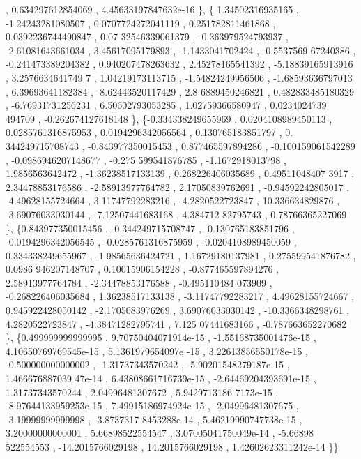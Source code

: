 \begin{DoxyCode}
      , 0.634297612854069 , 4.45633197847632e-16 \},
\{ 1.34502316935165 , -1.24243281080507 , 0.0707724272041119 , 0.251782811461868 , 0.0392236744490847 , 0.07
      32546339061379 , -0.363979524793937 , -2.61081643661034 ,  3.45617095179893 ,  -1.1433041702424 , -0.5537569
      67240386 , -0.241473389204382 , 0.940207478263632 ,  2.45278165541392 , -5.18839165913916 ,  3.2576634641749
      7 ,  1.04219173113715 , -1.54824249956506 , -1.68593636797013 ,  6.39693641182384 , -8.62443520117429 ,  2.8
      6889450246821 , 0.482833485180329 , -6.76931731256231 ,  6.50602793053285 ,  1.02759366580947 , 0.0234024739
      494709 , -0.262674127618148 \},
\{-0.334338249655969 , 0.0204108989450113 , 0.0285761316875953 , 0.0194296342056564 , 0.130765183851797 , 0.
      344249715708743 , -0.843977350015453 , 0.877465597894286 , -0.100159061542289 , -0.0986946207148677 , -0.275
      599541876785 ,  -1.1672918013798 ,   1.9856563642472 , -1.36238517133139 , 0.268226406035689 , 0.49511048407
      3917 ,  2.34478853176586 , -2.58913977764782 ,  2.17050839762691 , -0.94592242805017 , -4.49628155724664 ,  
      3.11747792283216 ,  -4.2820522723847 ,   10.336634829876 , -3.69076033030144 , -7.12507441683168 ,  4.384712
      82795743 ,  0.78766365227069 \},
\{0.843977350015456 , -0.344249715708747 , -0.130765183851796 , -0.0194296342056545 , -0.0285761316875959 , 
      -0.0204108989450059 , 0.334338249655967 , -1.98565636424721 ,  1.16729180137981 , 0.275599541876782 , 0.0986
      946207148707 ,  0.10015906154228 , -0.877465597894276 ,  2.58913977764784 , -2.34478853176588 , -0.495110484
      073909 , -0.268226406035684 ,  1.36238517133138 , -3.11747792283217 ,  4.49628155724667 , 0.945922428050142 
      ,  -2.1705083976269 ,  3.69076033030142 , -10.3366348298761 ,   4.2820522723847 , -4.38471282795741 ,  7.125
      07441683166 , -0.787663652270682 \},
\{0.499999999999995 , 9.70750404071914e-15 , -1.55168735001476e-15 , 4.10650769769545e-15 , 5.1361979654097e
      -15 , 3.22613856550178e-15 , -0.500000000000002 , -1.31737343570242 , -5.90201548279187e-15 , 1.466676887039
      47e-14 , 6.43808661716739e-15 , -2.64469204393691e-15 ,  1.31737343570244 ,  2.04996481307672 , 5.9429713186
      7173e-15 , -8.97644133959253e-15 , 7.49915186974924e-15 , -2.04996481307675 , -3.19999999999998 , -3.8737317
      8453288e-14 , 5.46219990747738e-15 ,  3.20000000000001 ,  5.66898522554547 , 3.07005041750049e-14 , -5.66898
      522554553 , -14.2015766029198 ,  14.2015766029198 , 1.42602623311242e-14 \}\}
\end{DoxyCode}
\mbox{\label{a00521_a12faa16cf926b3799b733b5da2993946}} 
